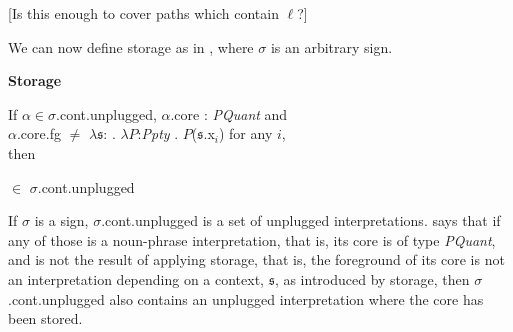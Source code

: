 [Is this enough to cover paths which contain $\ell$?]

We can now define storage as in
\nexteg{}, where $\sigma$ is an arbitrary sign.
\begin{ex} 
\textbf{Storage}

If $\alpha\in\sigma$.cont.unplugged, $\alpha$.core : \textit{PQuant}
and \\ $\alpha$.core.fg $\not=$
$\lambda\mathfrak{s}$:
  . $\lambda P$:\textit{Ppty} . $P$($\mathfrak{s}$.x$_i$) for any $i$, \\then

\hspace*{1em}

\hspace*{4em}$\in$ $\sigma$.cont.unplugged
                                 
\end{ex} 
If $\sigma$ is a sign, $\sigma$.cont.unplugged is a set of unplugged interpretations.
\preveg{} says that if any
of those is a noun-phrase interpretation, that is, its core is of type
\textit{PQuant}, and is not the result of applying storage, that is,
the foreground of its core is not an interpretation depending on a
context, $\mathfrak{s}$, as introduced by storage, then
$\sigma$.cont.unplugged also contains an unplugged interpretation
where the core has been stored. 

